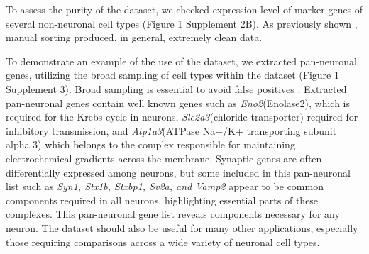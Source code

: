 To assess the purity of the dataset, we checked expression level of marker genes of several non-neuronal cell types (Figure 1 Supplement 2B). As previously shown \citep{Okaty_2011}, manual sorting produced, in general, extremely clean data.

 To demonstrate an example of the use of the dataset, we extracted pan-neuronal genes, utilizing the broad sampling of cell types within the dataset (Figure 1 Supplement 3). Broad sampling is essential to avoid false positives \citep{Zhang_2014,Mo_2015,Stefanakis_2015}. Extracted pan-neuronal genes contain well known genes such as \textit{Eno2}(Enolase2), which is required for the Krebs cycle in neurons, \textit{Slc2a3}(chloride transporter) required for inhibitory transmission, and \textit{Atp1a3}(ATPase Na+/K+ transporting subunit alpha 3) which belongs to the complex responsible for maintaining electrochemical gradients across the membrane. Synaptic genes are often differentially expressed among neurons, but some included in this pan-neuronal list such as \textit{Syn1, Stx1b, Stxbp1, Sv2a, and Vamp2} appear to be common components required in all neurons, highlighting essential parts of these complexes. This pan-neuronal gene list reveals components necessary for any neuron. The dataset should also be useful for many other applications, especially those requiring comparisons across a wide variety of neuronal cell types. 

